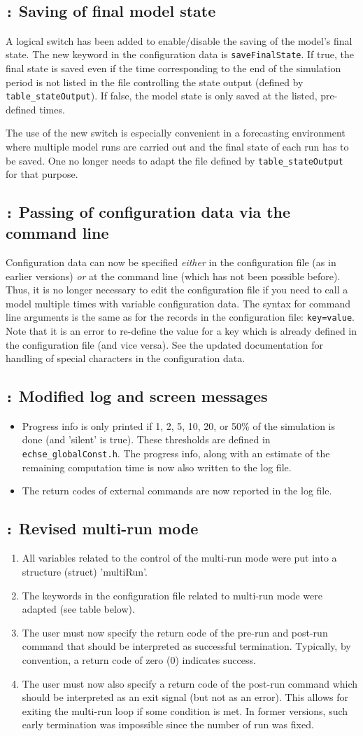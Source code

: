 \documentclass[a4paper,10pt]{article}
\newcommand{\logentry}[2]{\subsection*{\texttt{\color{red}{#1}:} \large{\textbf{#2}}}}
\begin{document}
\logentry{2012-01-19}{Saving of final model state}
A logical switch has been added to enable/disable the saving of the model's final state. The new keyword in the configuration data is \texttt{saveFinalState}. If true, the final state is saved even if the time corresponding to the end of the simulation period is not listed in the file controlling the state output (defined by \verb!table_stateOutput!). If false, the model state is only saved at the listed, pre-defined times.

The use of the new switch is especially convenient in a forecasting environment where multiple model runs are carried out and the final state of each run has to be saved. One no longer needs to adapt the file defined by \verb!table_stateOutput! for that purpose.

\logentry{2012-01-19}{Passing of configuration data via the command line}
Configuration data can now be specified \emph{either} in the configuration file (as in earlier versions) \emph{or} at the command line (which has not been possible before). Thus, it is no longer necessary to edit the configuration file if you need to call a model multiple times with variable configuration data. The syntax for command line arguments is the same as for the records in the configuration file: \texttt{key=value}. Note that it is an error to re-define the value for a key which is already defined in the configuration file (and vice versa). See the updated documentation for handling of special characters in the configuration data.

\logentry{2012-01-17}{Modified log and screen messages}
\begin{itemize}
  \item Progress info is only printed if 1, 2, 5, 10, 20, or 50\% of the simulation is done (and 'silent' is true). These thresholds are defined in \verb!echse_globalConst.h!. The progress info, along with an estimate of the remaining computation time is now also written to the log file.
  \item The return codes of external commands are now reported in the log file.
\end{itemize}

\logentry{2012-01-12}{Revised multi-run mode}
\begin{enumerate}
  \item All variables related to the control of the multi-run mode were put into a structure (struct) 'multiRun'.
  \item The keywords in the configuration file related to multi-run mode were adapted (see table below).
  \item The user must now specify the return code of the pre-run and post-run command that should be interpreted as successful termination. Typically, by convention, a return code of zero (0) indicates success.
  \item The user must now also specify a return code of the post-run command which should be interpreted as an exit signal (but not as an error). This allows for exiting the multi-run loop if some condition is met. In former versions, such early termination was impossible since the number of run was fixed.
\end{enumerate}
\end{document}
